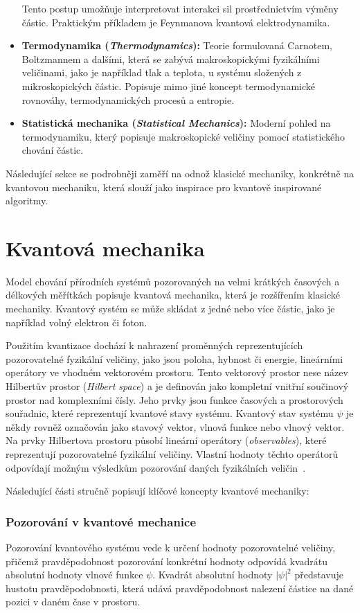 \begin{itemize}
    Tento postup umožňuje interpretovat interakci sil prostřednictvím výměny částic. Praktickým příkladem je Feynmanova kvantová elektrodynamika. 
    \item \textbf{Termodynamika (\emph{Thermodynamics}):} 
    Teorie formulovaná Carnotem, Boltzmannem a dalšími, která se zabývá makroskopickými fyzikálními veličinami, jako je například tlak a teplota, u systému složených z mikroskopických částic. 
    Popisuje mimo jiné koncept termodynamické rovnováhy, termodynamických procesů a entropie. 
    \item \textbf{Statistická mechanika (\emph{Statistical Mechanics}):} 
    Moderní pohled na termodynamiku, který popisuje makroskopické veličiny pomocí statistického chování částic.
\end{itemize}

Následující sekce se podrobněji zaměří na odnož klasické mechaniky, konkrétně na kvantovou mechaniku, která slouží jako inspirace pro kvantově inspirované algoritmy.

\section{Kvantová mechanika}
Model chování přírodních systémů pozorovaných na velmi krátkých časových a délkových měřítkách popisuje kvantová mechanika, která je rozšířením klasické mechaniky. 
Kvantový systém se může skládat z jedné nebo více částic, jako je například volný elektron či foton. 

Použitím kvantizace dochází k nahrazení proměnných reprezentujících pozorovatelné fyzikální veličiny, jako jsou poloha, hybnost či energie, lineárními operátory ve vhodném vektorovém prostoru. 
Tento vektorový prostor nese název Hilbertův prostor (\emph{Hilbert space}) a je definován jako kompletní vnitřní součinový prostor nad komplexními čísly. 
Jeho prvky jsou funkce časových a prostorových souřadnic, které reprezentují kvantové stavy systému. 
Kvantový stav systému $\psi$ je někdy rovněž označován jako stavový vektor, vlnová funkce nebo vlnový vektor. 
Na prvky Hilbertova prostoru působí lineární operátory (\emph{observables}), které reprezentují pozorovatelné fyzikální veličiny. 
Vlastní hodnoty těchto operátorů odpovídají možným výsledkům pozorování daných fyzikálních veličin~\cite{NaturalComputing}.

Následující části stručně popisují klíčové koncepty kvantové mechaniky:

\subsubsection*{Pozorování v kvantové mechanice}
Pozorování kvantového systému vede k určení hodnoty pozorovatelné veličiny, přičemž pravděpodobnost pozorování konkrétní hodnoty odpovídá kvadrátu absolutní hodnoty vlnové funkce $\psi$.
Kvadrát absolutní hodnoty $\left| \psi \right|^2$ představuje hustotu pravděpodobnosti, která udává pravděpodobnost nalezení částice na dané pozici v daném čase v prostoru. 
    
